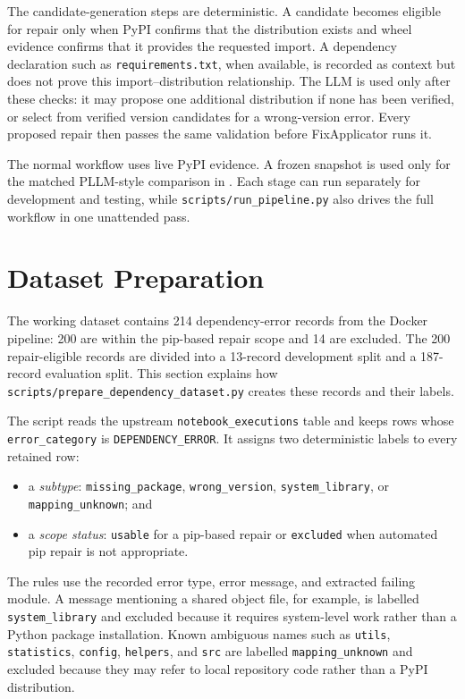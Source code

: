 The candidate-generation steps are deterministic. A candidate becomes
eligible for repair only when PyPI confirms that the distribution exists and
wheel evidence confirms that it provides the requested import. A dependency
declaration such as \texttt{requirements.txt}, when available, is recorded
as context but does not prove this import--distribution relationship. The
LLM is used only after these checks: it may propose one additional
distribution if none has been verified, or select from verified version
candidates for a wrong-version error. Every proposed repair then passes the
same validation before FixApplicator runs it.

The normal workflow uses live PyPI evidence. A frozen snapshot is used only
for the matched PLLM-style comparison in . Each stage
can run separately for development and testing, while
\texttt{scripts/run\_pipeline.py} also drives the full workflow in one
unattended pass.

\section{Dataset Preparation}
\label{sec:m-dataset}

The working dataset contains 214 dependency-error records from the Docker
pipeline: 200 are within the pip-based repair scope and 14 are excluded.
The 200 repair-eligible records are divided into a 13-record development
split and a 187-record evaluation split. This section explains how
\texttt{scripts/prepare\_dependency\_dataset.py} creates these records and
their labels.

The script reads the upstream \texttt{notebook\_executions} table and keeps
rows whose \texttt{error\_category} is \texttt{DEPENDENCY\_ERROR}. It assigns
two deterministic labels to every retained row:

\begin{itemize}
  \item a \emph{subtype}: \texttt{missing\_package},
        \texttt{wrong\_version}, \texttt{system\_library}, or
        \texttt{mapping\_unknown}; and
  \item a \emph{scope status}: \texttt{usable} for a pip-based repair or
        \texttt{excluded} when automated pip repair is not appropriate.
\end{itemize}

The rules use the recorded error type, error message, and extracted failing
module. A message mentioning a shared object file, for example, is labelled
\texttt{system\_library} and excluded because it requires system-level work
rather than a Python package installation. Known ambiguous names such as
\texttt{utils}, \texttt{statistics}, \texttt{config}, \texttt{helpers}, and
\texttt{src} are labelled \texttt{mapping\_unknown} and excluded because they
may refer to local repository code rather than a PyPI distribution.

